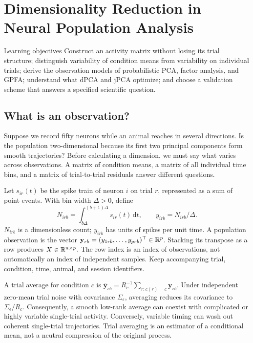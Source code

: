 \chapter{Dimensionality Reduction in Neural Population Analysis}\label{ch:06}

\begin{insight}{Learning objectives}
Construct an activity matrix without losing its trial structure; distinguish variability of condition means from variability on individual trials; derive the observation models of probabilistic PCA, factor analysis, and GPFA; understand what dPCA and jPCA optimize; and choose a validation scheme that answers a specified scientific question.
\end{insight}

\section{What is an observation?}
Suppose we record fifty neurons while an animal reaches in several directions. Is the population two-dimensional because its first two principal components form smooth trajectories? Before calculating a dimension, we must say what varies across observations. A matrix of condition means, a matrix of all individual time bins, and a matrix of trial-to-trial residuals answer different questions.

Let $s_{ir}(t)$ be the spike train of neuron $i$ on trial $r$, represented as a sum of point events. With bin width $\Delta>0$, define
\begin{equation}
 N_{irb}=\int_{b\Delta}^{(b+1)\Delta}s_{ir}(t)\,\mathrm dt,
 \qquad y_{irb}=N_{irb}/\Delta.\label{eq:06-counts}
\end{equation}
$N_{irb}$ is a dimensionless count; $y_{irb}$ has units of spikes per unit time. A population observation is the vector $\mathbf y_{rb}=(y_{1rb},\ldots,y_{prb})^\top\in\mathbb{R}^p$. Stacking its transpose as a row produces $X\in\mathbb{R}^{n\times p}$. The row index is an index of observations, not automatically an index of independent samples. Keep accompanying trial, condition, time, animal, and session identifiers.

A trial average for condition $c$ is $\bar{\mathbf y}_{cb}=R_c^{-1}\sum_{r:c(r)=c}\mathbf y_{rb}$. Under independent zero-mean trial noise with covariance $\Sigma_\epsilon$, averaging reduces its covariance to $\Sigma_\epsilon/R_c$. Consequently, a smooth low-rank average can coexist with complicated or highly variable single-trial activity. Conversely, variable timing can wash out coherent single-trial trajectories. Trial averaging is an estimator of a conditional mean, not a neutral compression of the original process.

